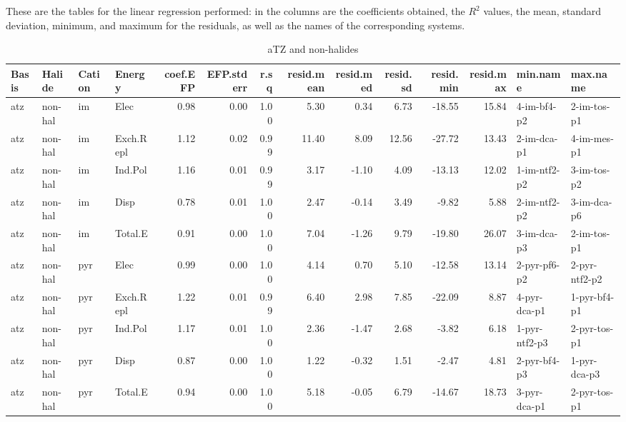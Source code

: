 \documentclass[a4paper]{article}
\begin{document}
\begin{landscape}
These are the tables for the linear regression performed: in the columns are the coefficients obtained, the $R^2$ values, the mean, standard deviation, minimum, and maximum for the residuals, as well as the names of the corresponding systems.


\begin{table}[ht]
\centering
\begin{tabular}{llllrrrrrrrrll}
  \hline
Basis & Halide & Cation & Energy & coef.EFP & EFP.stderr & r.sq & resid.mean & resid.med & resid.sd & resid.min & resid.max & min.name & max.name \\ 
  \hline
atz & non-hal & im & Elec & 0.98 & 0.00 & 1.00 & 5.30 & 0.34 & 6.73 & -18.55 & 15.84 & 4-im-bf4-p2 & 2-im-tos-p1 \\ 
  atz & non-hal & im & Exch.Repl & 1.12 & 0.02 & 0.99 & 11.40 & 8.09 & 12.56 & -27.72 & 13.43 & 2-im-dca-p1 & 4-im-mes-p1 \\ 
  atz & non-hal & im & Ind.Pol & 1.16 & 0.01 & 0.99 & 3.17 & -1.10 & 4.09 & -13.13 & 12.02 & 1-im-ntf2-p2 & 3-im-tos-p2 \\ 
  atz & non-hal & im & Disp & 0.78 & 0.01 & 1.00 & 2.47 & -0.14 & 3.49 & -9.82 & 5.88 & 2-im-ntf2-p2 & 3-im-dca-p6 \\ 
  atz & non-hal & im & Total.E & 0.91 & 0.00 & 1.00 & 7.04 & -1.26 & 9.79 & -19.80 & 26.07 & 3-im-dca-p3 & 2-im-tos-p1 \\ 
  atz & non-hal & pyr & Elec & 0.99 & 0.00 & 1.00 & 4.14 & 0.70 & 5.10 & -12.58 & 13.14 & 2-pyr-pf6-p2 & 2-pyr-ntf2-p2 \\ 
  atz & non-hal & pyr & Exch.Repl & 1.22 & 0.01 & 0.99 & 6.40 & 2.98 & 7.85 & -22.09 & 8.87 & 4-pyr-dca-p1 & 1-pyr-bf4-p1 \\ 
  atz & non-hal & pyr & Ind.Pol & 1.17 & 0.01 & 1.00 & 2.36 & -1.47 & 2.68 & -3.82 & 6.18 & 1-pyr-ntf2-p3 & 2-pyr-tos-p1 \\ 
  atz & non-hal & pyr & Disp & 0.87 & 0.00 & 1.00 & 1.22 & -0.32 & 1.51 & -2.47 & 4.81 & 2-pyr-bf4-p3 & 1-pyr-dca-p3 \\ 
  atz & non-hal & pyr & Total.E & 0.94 & 0.00 & 1.00 & 5.18 & -0.05 & 6.79 & -14.67 & 18.73 & 3-pyr-dca-p1 & 2-pyr-tos-p1 \\ 
   \hline
\end{tabular}
\caption{aTZ and non-halides}
\end{table}




\end{landscape}
\end{document}
